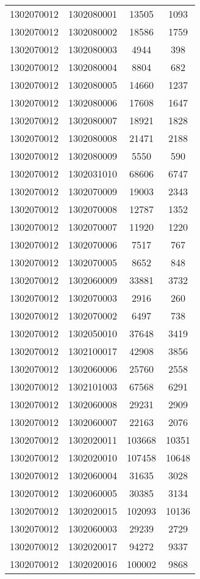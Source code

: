 \begin{longtable}[h]{llcc}
		1302070012 & 1302080001 & 13505 & 1093\\
		1302070012 & 1302080002 & 18586 & 1759\\
		1302070012 & 1302080003 & 4944 & 398\\
		1302070012 & 1302080004 & 8804 & 682\\
		1302070012 & 1302080005 & 14660 & 1237\\
		1302070012 & 1302080006 & 17608 & 1647\\
		1302070012 & 1302080007 & 18921 & 1828\\
		1302070012 & 1302080008 & 21471 & 2188\\
		1302070012 & 1302080009 & 5550 & 590\\
		1302070012 & 1302031010 & 68606 & 6747\\
		1302070012 & 1302070009 & 19003 & 2343\\
		1302070012 & 1302070008 & 12787 & 1352\\
		1302070012 & 1302070007 & 11920 & 1220\\
		1302070012 & 1302070006 & 7517 & 767\\
		1302070012 & 1302070005 & 8652 & 848\\
		1302070012 & 1302060009 & 33881 & 3732\\
		1302070012 & 1302070003 & 2916 & 260\\
		1302070012 & 1302070002 & 6497 & 738\\
		1302070012 & 1302050010 & 37648 & 3419\\
		1302070012 & 1302100017 & 42908 & 3856\\
		1302070012 & 1302060006 & 25760 & 2558\\
		1302070012 & 1302101003 & 67568 & 6291\\
		1302070012 & 1302060008 & 29231 & 2909\\
		1302070012 & 1302060007 & 22163 & 2076\\
		1302070012 & 1302020011 & 103668 & 10351\\
		1302070012 & 1302020010 & 107458 & 10648\\
		1302070012 & 1302060004 & 31635 & 3028\\
		1302070012 & 1302060005 & 30385 & 3134\\
		1302070012 & 1302020015 & 102093 & 10136\\
		1302070012 & 1302060003 & 29239 & 2729\\
		1302070012 & 1302020017 & 94272 & 9337\\
		1302070012 & 1302020016 & 100002 & 9868\\

\end{longtable}
